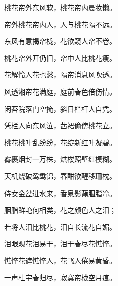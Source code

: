 \begin{poem}
    \begin{pl}桃花帘外东风软，桃花帘内晨妆懒。\end{pl}

    \begin{pl}帘外桃花帘内人，人与桃花隔不远。\end{pl}

    \begin{pl}东风有意揭帘栊，花欲窥人帘不卷。\end{pl}

    \begin{pl}桃花帘外开仍旧，帘中人比桃花瘦。\end{pl}

    \begin{pl}花解怜人花也愁，隔帘消息风吹透。\end{pl}

    \begin{pl}风透湘帘花满庭，庭前春色倍伤情。\end{pl}

    \begin{pl}闲苔院落门空掩，斜日栏杆人自凭。\end{pl}

    \begin{pl}凭栏人向东风泣，茜裙偷傍桃花立。\end{pl}

    \begin{pl}桃花桃叶乱纷纷，花绽新红叶凝碧。\end{pl}

    \begin{pl}雾裹烟封一万株，烘楼照壁红模糊。\end{pl}

    \begin{pl}天机烧破鸳鸯锦，春酣欲醒移珊枕。\end{pl}

    \begin{pl}侍女金盆进水来，香泉影蘸胭脂冷。\end{pl}

    \begin{pl}胭脂鲜艳何相类，花之颜色人之泪；\end{pl}

    \begin{pl}若将人泪比桃花，泪自长流花自媚。\end{pl}

    \begin{pl}泪眼观花泪易干，泪干春尽花憔悴。\end{pl}

    \begin{pl}憔悴花遮憔悴人，花飞人倦易黄昏。\end{pl}

    \begin{pl}一声杜宇春归尽，寂寞帘栊空月痕。\end{pl}


\end{poem}



